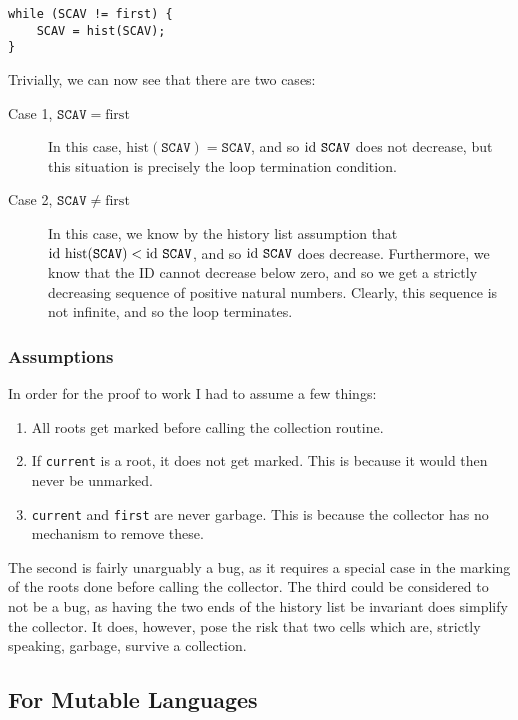 \begin{lstlisting}
while (SCAV != first) {
    SCAV = hist(SCAV);
}
\end{lstlisting}

Trivially, we can now see that there are two cases:

\begin{description}
  \item[Case 1, $\mathtt{SCAV} = \mathrm{first}$] In this case,
    $\mathrm{hist}(\mathtt{SCAV}) = \mathtt{SCAV}$, and so
    $\mathrm{id}~\mathtt{SCAV}$ does not decrease, but this situation is
    precisely the loop termination condition.

  \item[Case 2, $\mathtt{SCAV} \neq \mathrm{first}$] In this case, we
    know by the history list assumption that
    $\mathrm{id}~\mathrm{hist}(\mathtt{SCAV}) < \mathrm{id}~\mathtt{SCAV}$, and so
    $\mathrm{id}~\mathtt{SCAV}$ does decrease. Furthermore, we know that the
    ID cannot decrease below zero, and so we get a strictly decreasing
    sequence of positive natural numbers. Clearly, this sequence is
    not infinite, and so the loop terminates.
\end{description}

\subsubsection{Assumptions}

In order for the proof to work I had to assume a few things:

\begin{enumerate}
  \item All roots get marked before calling the collection routine.

  \item If \texttt{current} is a root, it does not get marked. This is
    because it would then never be unmarked.

  \item \texttt{current} and \texttt{first} are never garbage. This is
    because the collector has no mechanism to remove these.
\end{enumerate}

The second is fairly unarguably a bug, as it requires a special case in
the marking of the roots done before calling the collector. The third
could be considered to not be a bug, as having the two ends of the
history list be invariant does simplify the collector. It does,
however, pose the risk that two cells which are, strictly speaking,
garbage, survive a collection.

\subsection{For Mutable Languages}

